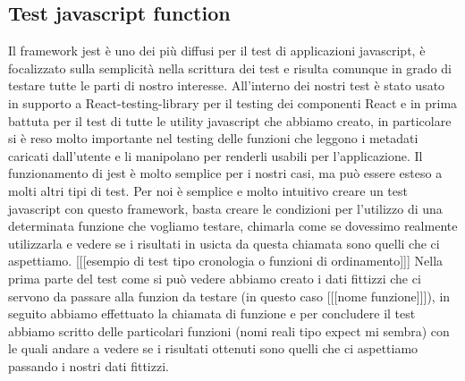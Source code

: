 \subsection{Test javascript function}
Il framework jest è uno dei più diffusi per il test di applicazioni javascript, è focalizzato sulla semplicità nella scrittura dei test e risulta comunque in grado di testare tutte le parti di nostro interesse.
All'interno dei nostri test è stato usato in supporto a React-testing-library per il testing dei componenti React e in prima battuta per il test di tutte le utility javascript che abbiamo creato, in particolare si è reso molto importante
nel testing delle funzioni che leggono i metadati caricati dall'utente e li manipolano per renderli usabili per l'applicazione. Il funzionamento di jest è molto semplice per i nostri casi, ma può essere esteso a molti altri
tipi di test. Per noi è semplice e molto intuitivo creare un test javascript con questo framework, basta creare le condizioni per l'utilizzo di una determinata funzione che vogliamo testare, chimarla come se
dovessimo realmente utilizzarla e vedere se i risultati in usicta da questa chiamata sono quelli che ci aspettiamo.
  [[[esempio di test tipo cronologia o funzioni di ordinamento]]]
Nella prima parte del test come si può vedere abbiamo creato i dati fittizzi che ci servono da passare alla funzion da testare (in questo caso [[[nome funzione]]]), in seguito abbiamo effettuato la chiamata di funzione e
per concludere il test abbiamo scritto delle particolari funzioni (nomi reali tipo expect mi sembra) con le quali andare a vedere se i risultati ottenuti sono quelli che ci aspettiamo passando i nostri dati fittizzi.
